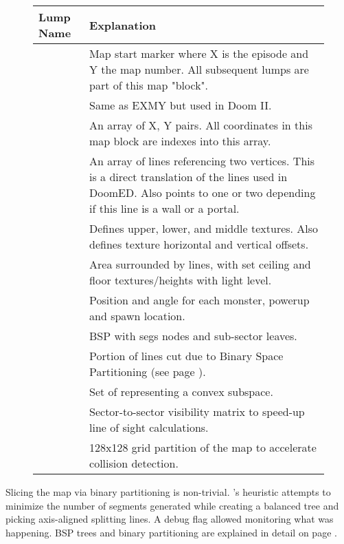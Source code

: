 \par
 \begin{figure}[H]
\centering  
\begin{tabularx}{\textwidth}{ L{0.15} L{0.75} }
  \toprule
  \textbf{Lump Name} &  \textbf{Explanation} \\
  \toprule 
   
    & Map start marker where X is the episode and Y the map number. All subsequent lumps are part of this map "block".\\
    & Same as EXMY but used in Doom II.\\
    & An array of  X, Y pairs. All coordinates in this map block are indexes into this array.\\
    & An array of lines referencing two vertices. This is a direct translation of the lines used in DoomED. Also points to one or two  depending if this line is a wall or a portal. \\
    & Defines upper, lower, and middle textures. Also defines texture horizontal and vertical offsets.\\
    & Area surrounded by lines, with set ceiling and floor textures/heights with light level.\\
    & Position and angle for each monster, powerup and spawn location.\\
   \toprule
    & BSP with segs nodes and sub-sector leaves.\\
    & Portion of lines cut due to Binary Space Partitioning (see page \pageref{Binary Space Partitioning: Theory}).\\
    & Set of  representing a convex subspace.\\
   \toprule
    & Sector-to-sector visibility matrix to speed-up line of sight calculations.\\
   \toprule
    & 128x128 grid partition of the map  to accelerate collision detection.\\
   \toprule
\end{tabularx}
\end{figure}
\par
{}

Slicing the map via binary partitioning is non-trivial. 's heuristic attempts to minimize the number of segments generated while creating a balanced tree and picking axis-aligned splitting lines. A debug flag  allowed monitoring what was happening. BSP trees and binary partitioning are explained in detail on page \pageref{Binary Space Partitioning: Theory}. \\
\par
{}
\par
